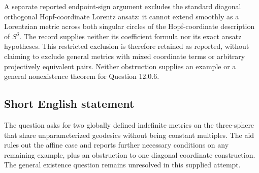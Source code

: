 \documentclass[11pt]{article}
\begin{document}
A separate reported endpoint-sign argument excludes the standard diagonal orthogonal Hopf-coordinate Lorentz ansatz: it cannot extend smoothly as a Lorentzian metric across both singular circles of the Hopf-coordinate description of \(S^3\). The record supplies neither its coefficient formula nor its exact ansatz hypotheses. This restricted exclusion is therefore retained as reported, without claiming to exclude general metrics with mixed coordinate terms or arbitrary projectively equivalent pairs. Neither obstruction supplies an example or a general nonexistence theorem for Question 12.0.6.
\subsection{Short English statement}
The question asks for two globally defined indefinite metrics on the three-sphere that share unparameterized geodesics without being constant multiples. The aid rules out the affine case and reports further necessary conditions on any remaining example, plus an obstruction to one diagonal coordinate construction. The general existence question remains unresolved in this supplied attempt.
\end{document}
